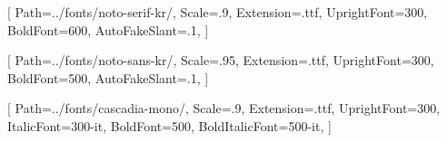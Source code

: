 \usepackage{fontspec}

\setmainfont{noto-serif-kr}[
    Path=../fonts/noto-serif-kr/,
    Scale=.9,
    Extension=.ttf,
    UprightFont=300,
    BoldFont=600,
    AutoFakeSlant=.1,
]

\setsansfont{noto-sans-kr}[
    Path=../fonts/noto-sans-kr/,
    Scale=.95,
    Extension=.ttf,
    UprightFont=300,
    BoldFont=500,
    AutoFakeSlant=.1,
]

\setmonofont{cascadia-mono}[
    Path=../fonts/cascadia-mono/,
    Scale=.9,
    Extension=.ttf,
    UprightFont=300,
    ItalicFont=300-it,
    BoldFont=500,
    BoldItalicFont=500-it,
]
